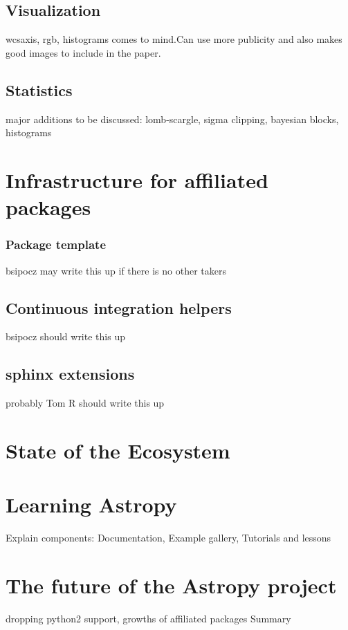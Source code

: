 \documentclass[modern]{aastex61}
\begin{document}
\subsection{Visualization}

wcsaxis, rgb, histograms comes to mind.Can use more publicity and also makes good images to include in the paper.

\subsection{Statistics}

major additions to be discussed: lomb-scargle, sigma clipping, bayesian blocks, histograms

\section{Infrastructure for affiliated packages}
\subsubsection{Package template}
bsipocz may write this up if there is no other takers
\subsection{Continuous integration helpers}
bsipocz should write this up
\subsection{sphinx extensions}
probably Tom R should write this up
\section{State of the Ecosystem}

\section{Learning Astropy}

Explain components: Documentation, Example gallery, Tutorials and lessons

\section{The future of the Astropy project}

dropping python2 support, growths of affiliated packages
Summary
\end{document}
